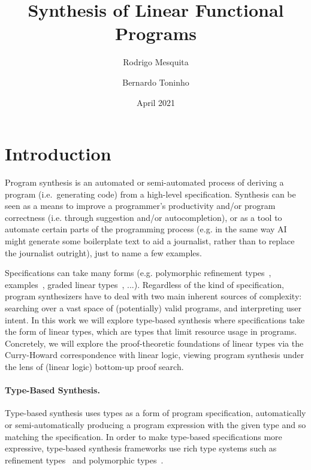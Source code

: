 \documentclass{llncs}
\title{Synthesis of Linear Functional Programs}
\author{Rodrigo Mesquita \and Bernardo Toninho}
\date{April 2021}
\institute{NOVA School of Science and Technology}
\newcommand{\mypara}[1]{\paragraph{\textbf{#1}.}}
\begin{document}
\maketitle

\section{Introduction}

Program synthesis is an automated or semi-automated process of
deriving a program (i.e.~generating code) from a high-level
specification.  
%
Synthesis can be seen as a means to improve a programmer's
productivity and/or program correctness (i.e. through suggestion
and/or autocompletion), or as a tool to automate certain parts of the
programming process (e.g. in the same way AI might generate some
boilerplate text to aid a journalist, rather than to replace the
journalist outright), just to name a few examples.

Specifications can take many forms (e.g.  polymorphic refinement
types~\cite{DBLP:conf/pldi/PolikarpovaKS16},
examples~\cite{DBLP:conf/popl/FrankleOWZ16}, graded linear
types~\cite{DBLP:conf/lopstr/HughesO20}, ...).  Regardless of the kind
of specification, program synthesizers have to deal with two main
inherent sources of complexity: searching over a vast space of
(potentially) valid programs, and interpreting user intent.
%
In this work we will explore type-based synthesis where specifications
take the form of linear types, which are types that limit resource
usage in programs.  Concretely, we will explore the proof-theoretic
foundations of linear types via the Curry-Howard correspondence with
linear logic, viewing program synthesis under the lens of (linear
logic) bottom-up proof search.

%

\mypara{Type-Based Synthesis}
Type-based synthesis uses types as a form of program specification,
automatically or semi-automatically producing a program expression
with the given type and so matching the specification.
%
In order to make type-based specifications more expressive, type-based
synthesis frameworks use rich type systems such as refinement
types~\cite{} and polymorphic types~\cite{}.
\end{document}
